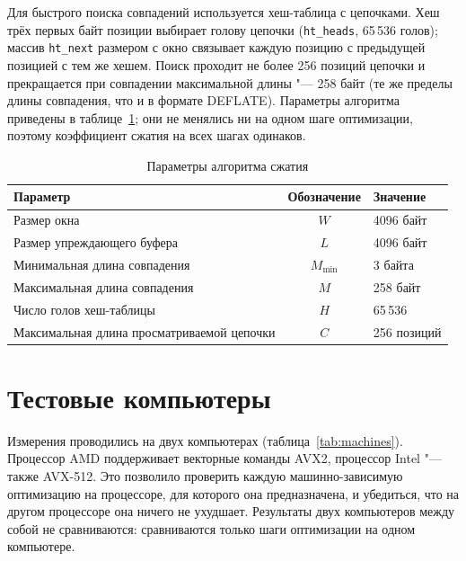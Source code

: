 Для быстрого поиска совпадений используется хеш-таблица с цепочками.
Хеш трёх первых байт позиции выбирает голову цепочки
(\texttt{ht\_heads}, 65\,536 голов); массив \texttt{ht\_next} размером с
окно связывает каждую позицию с предыдущей позицией с тем же хешем.
Поиск проходит не более 256 позиций цепочки и прекращается при совпадении
максимальной длины "--- 258 байт (те же пределы длины совпадения, что и в
формате DEFLATE). Параметры алгоритма приведены в
таблице~\ref{tab:params}; они не менялись ни на одном шаге оптимизации,
поэтому коэффициент сжатия на всех шагах одинаков.

\begin{table}[H]
\caption{Параметры алгоритма сжатия}
\label{tab:params}
\begin{tabletext}
\centering
\begin{tabular}{|l|c|l|}
\hline
\textbf{Параметр} & \textbf{Обозначение} & \textbf{Значение} \\
\hline
Размер окна & $W$ & 4096 байт \\
Размер упреждающего буфера & $L$ & 4096 байт \\
Минимальная длина совпадения & $M_{\min}$ & 3 байта \\
Максимальная длина совпадения & $M$ & 258 байт \\
Число голов хеш-таблицы & $H$ & 65\,536 \\
Максимальная длина просматриваемой цепочки & $C$ & 256 позиций \\
\hline
\end{tabular}
\end{tabletext}
\end{table}

\section{Тестовые компьютеры}

Измерения проводились на двух компьютерах (таблица~\ref{tab:machines}).
Процессор AMD поддерживает векторные команды AVX2, процессор Intel "---
также AVX-512. Это позволило проверить каждую машинно-зависимую
оптимизацию на процессоре, для которого она предназначена, и убедиться, что
на другом процессоре она ничего не ухудшает. Результаты двух компьютеров
между собой не сравниваются: сравниваются только шаги оптимизации на одном
компьютере.

